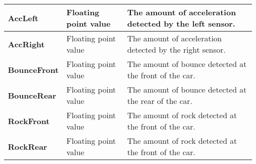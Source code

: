 \begin{table}[h]
{\begin{tabular}{ | l | l | l | }
\textbf{AccLeft}        & Floating point value                   & The amount of acceleration detected by the left sensor.  \\ \hline
\textbf{AccRight}       & Floating point value                   & The amount of acceleration detected by the right sensor.  \\ \hline
\textbf{BounceFront}    & Floating point value                   & The amount of bounce detected at the front of the car.  \\ \hline
\textbf{BounceRear}     & Floating point value                   & The amount of bounce detected at the rear of the car.  \\ \hline
\textbf{RockFront}      & Floating point value                   & The amount of rock detected at the front of the car.  \\ \hline
\textbf{RockRear}       & Floating point value                   & The amount of rock detected at the front of the car.  \\ \hline

\end{tabular}}
\end{table}